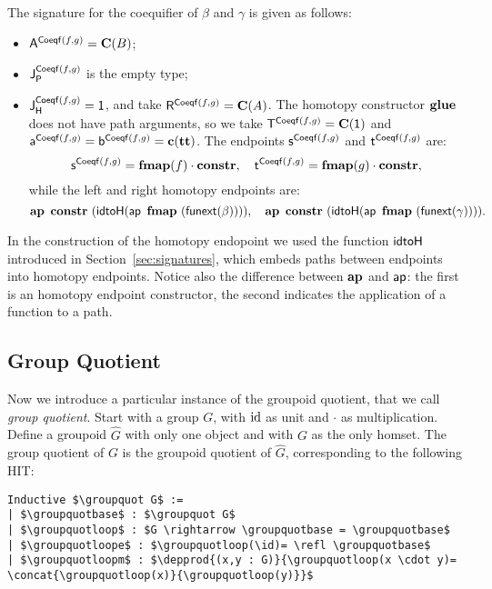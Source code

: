 The signature for the coequifier of $\beta$ and $\gamma$ is given as follows:
\begin{itemize}
\item $\pointconstr[\coequifier f g] = \constantP{B}$;
\item $\pathlabel[\coequifier f g]$ is the empty type; 
\item $\homotlabel[\coequifier f g] = \unit$, and take 
  $\homotpointarg[\coequifier f g] = \constantP{A}$.
  The homotopy constructor $\coequifierglue$ does not have path arguments, so we take  
  $\homotpathtarg[\coequifier f g] = \constantP{\unit}$ and
  $\pathargleft[\coequifier f g] = \pathargright[\coequifier f g] = \Ce(\unitt)$.
  The endpoints $\homotpathleft[\coequifier f g]$ and $\homotpathright[\coequifier f g]$ are:
  \[
  \homotpathleft[\coequifier f g] = \comp{\fmap(f)}{\constr}, \quad
  \homotpathright[\coequifier f g] = \comp{\fmap(g)}{\constr},
  \]
  while the left and right homotopy endpoints are:
  \[
  \hap{\constr}{(\idtoH(\ap{\fmap}{(\funextsec(\beta))}))}, \quad
  \hap{\constr}{(\idtoH(\ap{\fmap}{(\funextsec(\gamma))}))}.
  \]
\end{itemize}
In the construction of the homotopy endopoint we used the function
$\idtoH$ introduced in Section~\ref{sec:signatures}, which embeds
paths between endpoints into homotopy endpoints. Notice also the
difference between $\constructor{ap}$ and $\constfont{ap}$: the first
is an homotopy endpoint constructor, the second indicates the
application of a function to a path.


\subsection{Group Quotient}
\label{sec:group_quotient}

Now we introduce a particular instance of the groupoid quotient, that
we call \emph{group quotient}. Start with a group $G$, with $\id$ as
unit and $\cdot$ as multiplication. Define a groupoid $\widehat{G}$
with only one object and with $G$ as the only homset. The group
quotient of $G$ is the groupoid quotient of $\widehat{G}$,
corresponding to the following HIT:
\begin{lstlisting}[mathescape=true]
Inductive $\groupquot G$ :=
| $\groupquotbase$ : $\groupquot G$
| $\groupquotloop$ : $G \rightarrow \groupquotbase = \groupquotbase$
| $\groupquotloope$ : $\groupquotloop(\id)= \refl \groupquotbase$
| $\groupquotloopm$ : $\depprod{(x,y : G)}{\groupquotloop(x \cdot y)= \concat{\groupquotloop(x)}{\groupquotloop(y)}}$
\end{lstlisting}



